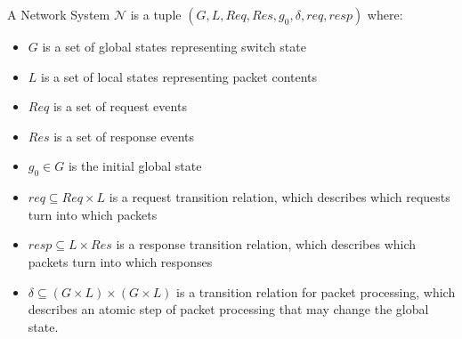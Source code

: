 A Network System $\mathcal{N}$ is a tuple $(G, L, \mathit{Req}, \mathit{Res}, g_0, \delta, \mathit{req}, \mathit{resp})$ where:
\begin{itemize}
\item $G$ is a set of global states representing switch state
\item $L$ is a set of local states representing packet contents
\item $\mathit{Req}$ is a set of request events
\item $\mathit{Res}$ is a set of response events
\item $g_0 \in G$ is the initial global state
\item $\mathit{req} \subseteq \mathit{Req} \times L$ is a request transition relation, which describes which requests turn into which packets
\item $\mathit{resp} \subseteq L \times \mathit{Res}$ is a response transition relation, which describes which packets turn into which responses
\item $\delta \subseteq (G \times L) \times (G \times L)$ is a transition relation for packet processing, which describes an atomic step of packet processing that may change the global state.
\end{itemize}


